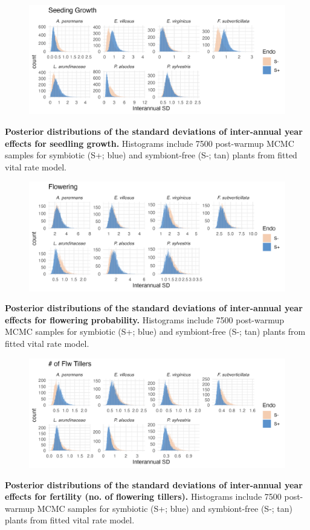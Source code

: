 \documentclass[12pt]{article}
\begin{document}
\begin{figure}[H]
	\centering
	\includegraphics[width=.9\linewidth]{seedgrow_sigmayear_hist.png}
\end{figure}
 \textbf{Posterior distributions of the standard deviations of inter-annual year effects for seedling growth.} Histograms include 7500 post-warmup MCMC samples for symbiotic (S+; blue) and symbiont-free (S-; tan) plants from fitted vital rate model.
\newpage

\begin{figure}[H]
	\centering
	\includegraphics[width=.9\linewidth]{flow_sigmayear_hist.png}
\end{figure}
 \textbf{Posterior distributions of the standard deviations of inter-annual year effects for flowering probability.} Histograms include 7500 post-warmup MCMC samples for symbiotic (S+; blue) and symbiont-free (S-; tan) plants from fitted vital rate model.


\begin{figure}[H]
	\centering
	\includegraphics[width=.9\linewidth]{fert_sigmayear_hist.png}
\end{figure}
 \textbf{Posterior distributions of the standard deviations of inter-annual year effects for fertility (no. of flowering tillers).} Histograms include 7500 post-warmup MCMC samples for symbiotic (S+; blue) and symbiont-free (S-; tan) plants from fitted vital rate model.
\newpage
\end{document}
